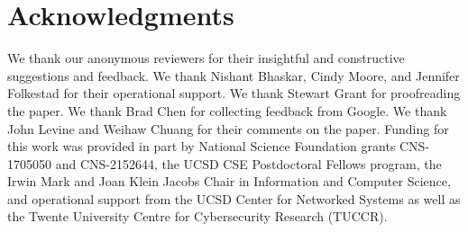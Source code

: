 \section*{Acknowledgments}
We thank our anonymous reviewers for their insightful and constructive suggestions and feedback.
We thank Nishant Bhaskar, Cindy Moore, and Jennifer Folkestad for their operational support. We thank Stewart Grant for proofreading the paper. We thank Brad Chen for collecting feedback from Google. We thank John Levine and Weihaw Chuang for their comments on the paper.  Funding for this work was provided in part by National Science
Foundation grants CNS-1705050 and CNS-2152644, the UCSD CSE
Postdoctoral Fellows program, the Irwin Mark and Joan Klein Jacobs
Chair in Information and Computer Science, and operational support
from the UCSD Center for Networked Systems as well as the Twente University Centre for Cybersecurity Research (TUCCR).

